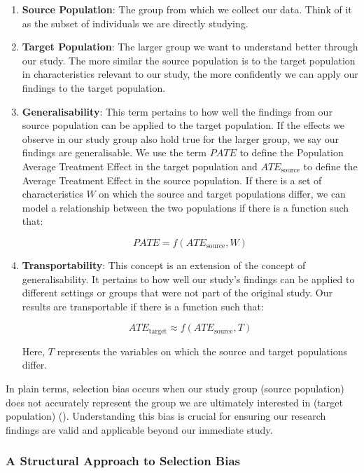 \documentclass[
  singlecolumn,
  9pt]{article}
\begin{document}
\begin{enumerate}
\def\labelenumi{\arabic{enumi}.}
\item
  \textbf{Source Population}: The group from which we collect our data.
  Think of it as the subset of individuals we are directly studying.
\item
  \textbf{Target Population}: The larger group we want to understand
  better through our study. The more similar the source population is to
  the target population in characteristics relevant to our study, the
  more confidently we can apply our findings to the target population.
\item
  \textbf{Generalisability}: This term pertains to how well the findings
  from our source population can be applied to the target population. If
  the effects we observe in our study group also hold true for the
  larger group, we say our findings are generalisable. We use the term
  \(PATE\) to define the Population Average Treatment Effect in the
  target population and \(ATE_{\text{source}}\) to define the Average
  Treatment Effect in the source population. If there is a set of
  characteristics \(W\) on which the source and target populations
  differ, we can model a relationship between the two populations if
  there is a function such that:

  \[PATE = f(ATE_{\text{source}}, W)\]
\item
  \textbf{Transportability}: This concept is an extension of the concept
  of generalisability. It pertains to how well our study's findings can
  be applied to different settings or groups that were not part of the
  original study. Our results are transportable if there is a function
  such that:

  \[ATE_{\text{target}} \approx f(ATE_{\text{source}}, T)\]

  Here, \(T\) represents the variables on which the source and target
  populations differ.
\end{enumerate}

In plain terms, selection bias occurs when our study group (source
population) does not accurately represent the group we are ultimately
interested in (target population) (). Understanding this bias is crucial for ensuring our research
findings are valid and applicable beyond our immediate study.

\subsubsection{A Structural Approach to Selection
Bias}\label{a-structural-approach-to-selection-bias}
\end{document}
